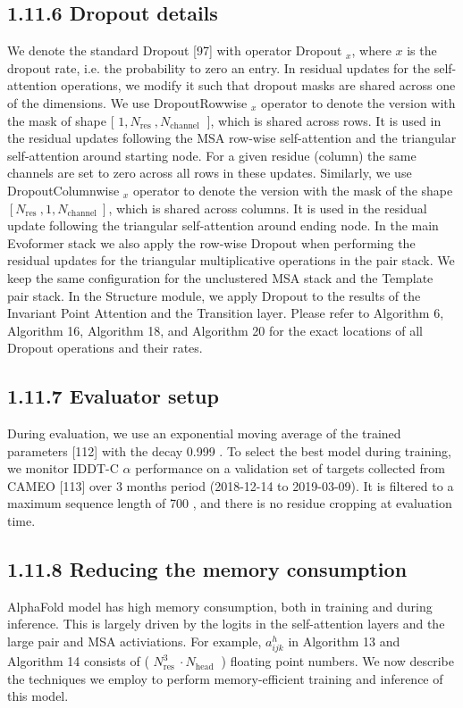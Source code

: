 \documentclass[10pt]{article}
\begin{document}
\subsection*{1.11.6 Dropout details}
We denote the standard Dropout [97] with operator Dropout $_{x}$, where $x$ is the dropout rate, i.e. the probability to zero an entry. In residual updates for the self-attention operations, we modify it such that dropout masks are shared across one of the dimensions. We use DropoutRowwise ${ }_{x}$ operator to denote the version with the mask of shape [ $1, N_{\text {res }}, N_{\text {channel }}$ ], which is shared across rows. It is used in the residual updates following the MSA row-wise self-attention and the triangular self-attention around starting node. For a given residue (column) the same channels are set to zero across all rows in these updates. Similarly, we use DropoutColumnwise ${ }_{x}$ operator to denote the version with the mask of the shape $\left[N_{\text {res }}, 1, N_{\text {channel }}\right]$, which is shared across columns. It is used in the residual update following the triangular self-attention around ending node. In the main Evoformer stack we also apply the row-wise Dropout when performing the residual updates for the triangular multiplicative operations in the pair stack. We keep the same configuration for the unclustered MSA stack and the Template pair stack. In the Structure module, we apply Dropout to the results of the Invariant Point Attention and the Transition layer. Please refer to Algorithm 6, Algorithm 16, Algorithm 18, and Algorithm 20 for the exact locations of all Dropout operations and their rates.

\subsection*{1.11.7 Evaluator setup}
During evaluation, we use an exponential moving average of the trained parameters [112] with the decay 0.999 . To select the best model during training, we monitor IDDT-C $\alpha$ performance on a validation set of targets collected from CAMEO [113] over 3 months period (2018-12-14 to 2019-03-09). It is filtered to a maximum sequence length of 700 , and there is no residue cropping at evaluation time.

\subsection*{1.11.8 Reducing the memory consumption}
AlphaFold model has high memory consumption, both in training and during inference. This is largely driven by the logits in the self-attention layers and the large pair and MSA activiations. For example, $a_{i j k}^{h}$ in Algorithm 13 and Algorithm 14 consists of ( $N_{\text {res }}^{3} \cdot N_{\text {head }}$ ) floating point numbers. We now describe the techniques we employ to perform memory-efficient training and inference of this model.
\end{document}
